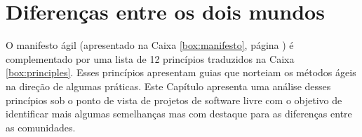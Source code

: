 \chapter{Diferenças entre os dois mundos}
\label{cap:diferencas}

O manifesto ágil (apresentado na Caixa \ref{box:manifesto}, página
\pageref{box:manifesto}) é complementado por uma lista de 12
princípios traduzidos na Caixa \ref{box:principles}. Esses princípios
apresentam guias que norteiam os métodos ágeis na direção de algumas
práticas. Este Capítulo apresenta uma análise desses princípios sob o
ponto de vista de projetos de software livre com o objetivo de
identificar mais algumas semelhanças mas com destaque para as
diferenças entre as comunidades.

